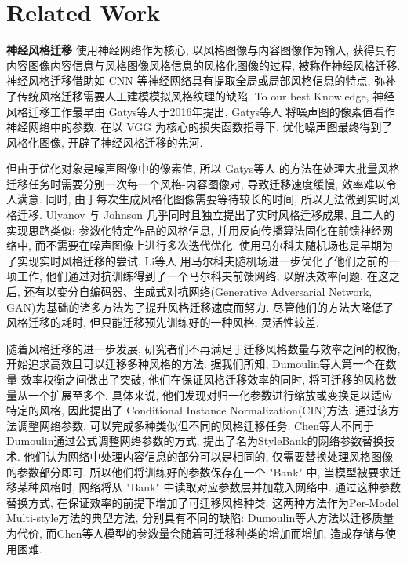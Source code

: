 \section{Related Work}

\textbf{神经风格迁移} 使用神经网络作为核心, 以风格图像与内容图像作为输入, 获得具有内容图像内容信息与风格图像风格信息的风格化图像的过程, 被称作神经风格迁移. 神经风格迁移借助如 CNN\cite{tammina2019transfer} 等神经网络具有提取全局或局部风格信息的特点, 弥补了传统风格迁移需要人工建模模拟风格纹理的缺陷. To our best Knowledge, 神经风格迁移工作最早由 Gatys等人于2016年\cite{gatys2016image}提出. Gatys等人\cite{gatys2016image} 将噪声图的像素值看作神经网络中的参数, 在以 VGG\cite{simonyan2014very} 为核心的损失函数指导下, 优化噪声图最终得到了风格化图像, 开辟了神经风格迁移的先河. 

但由于优化对象是噪声图像中的像素值, 所以 Gatys等人\cite{gatys2016image} 的方法在处理大批量风格迁移任务时需要分别一次每一个风格-内容图像对, 导致迁移速度缓慢, 效率难以令人满意. 同时, 由于每次生成风格化图像需要等待较长的时间, 所以无法做到实时风格迁移. Ulyanov\cite{ulyanov2016texture} 与 Johnson\cite{johnson2016perceptual} 几乎同时且独立提出了实时风格迁移成果, 且二人的实现思路类似: 参数化特定作品的风格信息, 并用反向传播算法固化在前馈神经网络中, 而不需要在噪声图像上进行多次迭代优化. 
使用马尔科夫随机场也是早期为了实现实时风格迁移的尝试. Li等人\cite{li2016precomputed} 用马尔科夫随机场进一步优化了他们之前的一项工作\cite{li2016combining}, 他们通过对抗训练得到了一个马尔科夫前馈网络, 以解决效率问题.
在这之后, 还有以变分自编码器\cite{zhang2023caster}、生成式对抗网络(Generative Adversarial Network, GAN)\cite{zhu2017unpaired,karras2019style,Men_2022_CVPR}为基础的诸多方法为了提升风格迁移速度而努力.
尽管他们的方法大降低了风格迁移的耗时, 但只能迁移预先训练好的一种风格, 灵活性较差. 

随着风格迁移的进一步发展, 研究者们不再满足于迁移风格数量与效率之间的权衡, 开始追求高效且可以迁移多种风格的方法. 
据我们所知, Dumoulin等人\cite{dumoulin2016learned}第一个在数量-效率权衡之间做出了突破, 他们在保证风格迁移效率的同时, 将可迁移的风格数量从一个扩展至多个. 具体来说, 他们发现对归一化参数进行缩放或变换足以适应特定的风格, 因此提出了 Conditional Instance Normalization(CIN)方法. 通过该方法调整网络参数, 可以完成多种类似但不同的风格迁移任务. 
Chen等人\cite{chen2017stylebank}不同于Dumoulin\cite{dumoulin2016learned}通过公式调整网络参数的方式, 提出了名为StyleBank的网络参数替换技术. 他们认为网络中处理内容信息的部分可以是相同的, 仅需要替换处理风格图像的参数部分即可. 所以他们将训练好的参数保存在一个 "Bank" 中, 当模型被要求迁移某种风格时, 网络将从 "Bank" 中读取对应参数层并加载入网络中. 通过这种参数替换方式, 在保证效率的前提下增加了可迁移风格种类. 
这两种方法作为Per-Model Multi-style方法的典型方法, 分别具有不同的缺陷: Dumoulin等人\cite{dumoulin2016learned}方法以迁移质量为代价, 而Chen等人\cite{chen2017stylebank}模型的参数量会随着可迁移种类的增加而增加, 造成存储与使用困难.

